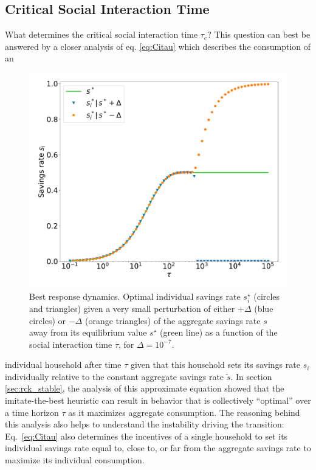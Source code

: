 \subsection{Critical Social Interaction Time}
\label{sec:savings_critical_tau}
What determines the critical social interaction time $\tau_\mathrm{c}$?
This question can best be answered by a closer analysis of eq. \eqref{eq:Citau} which describes the consumption of an 
\begin{figure}
  \centering
  \hspace{-1.5cm}\includegraphics[width = .7 \textwidth]{figures/best_response.pdf}
  \caption[Best response dynamics for individuals savings rates]{Best response dynamics. Optimal individual savings rate $s_i^\star$ (circles and triangles) given a very small perturbation of either $+\Delta$ (blue circles) or $-\Delta$ (orange triangles) of the aggregate savings rate $s$ away from its equilibrium value $s^\star$ (green line) as a function of the social interaction time $\tau$, for $\Delta = 10^{-7}$.}\hspace{.5cm}
  \label{fig:best_response}
\end{figure}
 individual household after time $\tau$ given that this household sets its savings rate $s_i$ individually relative to the constant aggregate savings rate $\tilde{s}$.
In section \ref{sec:rck_stable}, the analysis of this approximate equation showed that the imitate-the-best heuristic can result in behavior that is collectively ``optimal'' over a time horizon $\tau$ as it maximizes aggregate consumption. 
The reasoning behind this analysis also helps to understand the instability driving the transition: Eq.~\eqref{eq:Citau} also determines the incentives of a single household to set its individual savings rate equal to, close to, or far from the aggregate savings rate to maximize its individual consumption. 
